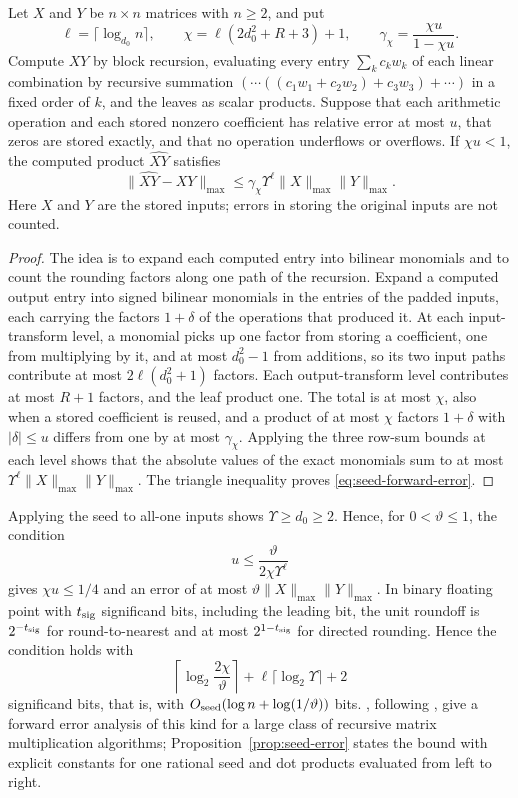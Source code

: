 \begin{proposition}\label{prop:seed-error}
Let \(X\) and \(Y\) be \(n\times n\) matrices with \(n\ge2\), and put
\[
 \ell=\lceil\log_{d_0}n\rceil,\qquad
 \chi=\ell(2d_0^2+R+3)+1,\qquad
 \gamma_\chi=\frac{\chi u}{1-\chi u}.
\]
Compute \(XY\) by block recursion, evaluating every entry
\(\sum_kc_kw_k\) of each linear combination by recursive summation
\((\cdots((c_1w_1+c_2w_2)+c_3w_3)+\cdots)\) in a fixed order of \(k\),
and the leaves as scalar products. Suppose that each arithmetic operation and
each stored nonzero coefficient has relative error at most \(u\), that
zeros are stored exactly, and that no operation underflows or
overflows. If \(\chi u<1\), the computed product \(\widehat{XY}\)
satisfies
\begin{equation}\label{eq:seed-forward-error}
 \|\widehat{XY}-XY\|_{\max}
 \le\gamma_\chi\Upsilon^\ell\|X\|_{\max}\|Y\|_{\max}.
\end{equation}
Here \(X\) and \(Y\) are the stored inputs; errors in storing the
original inputs are not counted.
\end{proposition}

\begin{proof}
The idea is to expand each computed entry into bilinear monomials and to
count the rounding factors along one path of the recursion. Expand a
computed output entry into signed bilinear monomials in the entries of
the padded inputs, each carrying the factors \(1+\delta\) of the
operations that produced it. At each input-transform level, a monomial
picks up one factor from storing a coefficient, one from multiplying by
it, and at most \(d_0^2-1\) from additions, so its two input paths
contribute at most \(2\ell(d_0^2+1)\) factors. Each output-transform
level contributes at most \(R+1\) factors, and the leaf product one. The
total is at most \(\chi\), also when a stored coefficient is reused, and
a product of at most \(\chi\) factors \(1+\delta\) with \(|\delta|\le u\)
differs from one by at most \(\gamma_\chi\). Applying the three row-sum
bounds at each level shows that the absolute values of the exact
monomials sum to at most \(\Upsilon^\ell\|X\|_{\max}\|Y\|_{\max}\). The
triangle inequality proves \eqref{eq:seed-forward-error}.
\end{proof}

Applying the seed to all-one inputs shows \(\Upsilon\ge d_0\ge2\). Hence,
for \(0<\vartheta\le1\), the condition
\[
 u\le\frac{\vartheta}{2\chi\Upsilon^\ell}
\]
gives \(\chi u\le1/4\) and an error of at most
\(\vartheta\|X\|_{\max}\|Y\|_{\max}\). In binary floating point with
\(t_{\rm sig}\) significand bits, including the leading bit, the unit
roundoff is \(2^{-t_{\rm sig}}\) for round-to-nearest and at most
\(2^{1-t_{\rm sig}}\) for directed
rounding. Hence the condition holds with
\[
 \left\lceil\log_2\frac{2\chi}{\vartheta}\right\rceil
 +\ell\lceil\log_2\Upsilon\rceil+2
\]
significand bits, that is, with
\(O_{\rm seed}(\log n+\log(1/\vartheta))\) bits. \citet{DDHK07}, following \citet{BL80}, give a forward error
analysis of this kind for a large class of recursive matrix
multiplication algorithms; Proposition~\ref{prop:seed-error} states the
bound with explicit constants for one rational seed and dot products
evaluated from left to right.

